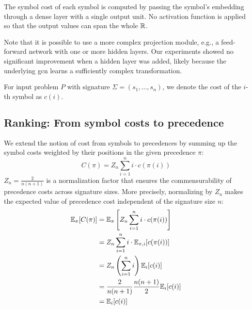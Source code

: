 The symbol cost of each symbol is computed by passing the symbol's embedding through a dense layer with a single output unit.
No activation function is applied so that the output values can span the whole $\operatorname{\mathbb{R}}$.

Note that it is possible to use a more complex projection module,
e.g., a feed-forward network with one or more hidden layers.
Our experiments showed no significant improvement when a hidden layer was added,
likely because the underlying \gls{gcn} learns a sufficiently complex transformation.

For input problem $P$
with signature $\Sigma = (s_1, \ldots, s_n)$,
we denote the cost of the $i$-th symbol as $c(i)$.

\subsection{Ranking: From symbol costs to precedence}
\label{sec:ranking}


We extend the notion of cost from symbols to precedences
by summing up the symbol costs
weighted by their positions in the given precedence $\pi$:
$$
C(\pi) = Z_n \sum_{i=1}^n i \cdot c(\pi(i))
$$
$Z_n = \frac{2}{n(n+1)}$ is a normalization factor
that ensures the commensurability of precedence costs across signature sizes.
More precisely, normalizing by $Z_n$ makes the expected value of precedence cost
independent of the signature size $n$:
\begin{align*}
\mathbb{E}_\pi [C(\pi)]
&= \mathbb{E}_\pi \left[Z_n \sum_{i=1}^n i \cdot c(\pi(i))\right] \\
&= Z_n \sum_{i=1}^n i \cdot \mathbb{E}_{\pi, i} [c(\pi(i))] \\
&= Z_n \left(\sum_{i=1}^n i\right) \mathbb{E}_i [c(i)] \\
&= \frac{2}{n(n+1)} \frac{n(n+1)}{2} \mathbb{E}_i [c(i)] \\
&= \mathbb{E}_i [c(i)]
\end{align*}

